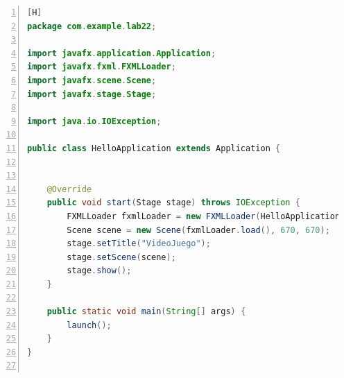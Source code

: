 \documentclass{article}
\begin{document}
	\begin{lstlisting}[language=java,caption={Clase HelloApplication}, numbers=left][H]
package com.example.lab22;

import javafx.application.Application;
import javafx.fxml.FXMLLoader;
import javafx.scene.Scene;
import javafx.stage.Stage;

import java.io.IOException;

public class HelloApplication extends Application {


    @Override
    public void start(Stage stage) throws IOException {
        FXMLLoader fxmlLoader = new FXMLLoader(HelloApplication.class.getResource("hello-view.fxml"));
        Scene scene = new Scene(fxmlLoader.load(), 670, 670);
        stage.setTitle("VideoJuego");
        stage.setScene(scene);
        stage.show();
    }

    public static void main(String[] args) {
        launch();
    }
}


	\end{lstlisting}
	
\end{document}
